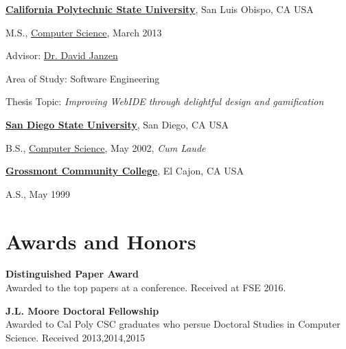 \documentclass[10pt]{article}
\begin{document}
        
\href{http://www.calpoly.edu/}{\textbf{California Polytechnic State University}},
San Luis Obispo, CA USA
\begin{outerlist}
\item[] M.S.,
		\vspace{-.2\baselineskip}
        \href{https://www.csc.calpoly.edu/}
             {Computer Science}, March 2013
              \begin{innerlist}
             \item Advisor:
              \href{https://users.csc.calpoly.edu/~djanzen/}
                   {Dr. David Janzen} 
        \item Area of Study: Software Engineering 
        \item Thesis Topic: \emph{Improving WebIDE through delightful design and gamification}
        \end{innerlist}
              
\end{outerlist}
\vspace{.5\baselineskip}

\href{https://www.sdsu.edu/}{\textbf{San Diego State University}},
San Diego, CA USA
\begin{outerlist}

\item[] B.S.,
        \href{https://www.cs.sdsu.edu/}
             {Computer Science}, May 2002, \emph{Cum Laude}
\end{outerlist}
\vspace{.5\baselineskip}


\href{http://www.grossmont.edu/}{\textbf{Grossmont Community College}},
El Cajon, CA USA
\begin{outerlist}

\item[] A.S.,
             May 1999
\end{outerlist}

\section{Awards and Honors}
\textbf{Distinguished Paper Award}\\
Awarded to the top papers at a conference. Received at FSE 2016.

\textbf{J.L. Moore Doctoral Fellowship}  \\
Awarded to Cal Poly CSC graduates who persue Doctoral Studies in Computer Science. Received 2013,2014,2015
\end{document}
